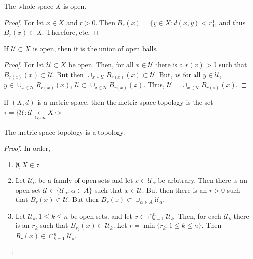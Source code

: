 \documentclass[crop=false,class=article,oneside]{standalone}
\begin{document}
        \begin{theorem}
        The whole space $X$ is open.
        \end{theorem}
        \begin{proof}
        For let $x\in X$ and $r>0$. Then $B_{r}(x) = \{y\in X:d(x,y)<r\}$, and thus $B_{r}(x)\subset X$. Therefore, etc.
        \end{proof}
        \begin{theorem}
        If $\mathcal{U}\subset X$ is open, then it is the union of open balls.
        \end{theorem}
        \begin{proof}
        For let $\mathcal{U} \subset X$ be open. Then, for all $x\in \mathcal{U}$ there is a $r(x)>0$ such that $B_{r(x)}(x) \subset \mathcal{U}$. But then $\cup_{x\in \mathcal{U}}B_{r(x)}(x)\subset \mathcal{U}$. But, as for all $y\in \mathcal{U}$, $y\in \cup_{x\in \mathcal{U}}B_{r(x)}(x)$, $\mathcal{U} \subset \cup_{x\in \mathcal{U}}B_{r(x)}(x)$. Thus, $\mathcal{U}= \cup_{x\in \mathcal{U}}B_{r(x)}(x)$.
        \end{proof}
        \begin{definition}
        If $(X,d)$ is a metric space, then the metric space topology is the set $\tau = \{\mathcal{U}:\mathcal{U}\underset{Open}\subset X\}$>
        \end{definition}
        \begin{theorem}
        The metric space topology is a topology.
        \end{theorem}
        \begin{proof}
        In order,
        \begin{enumerate}
        \item $\emptyset, X \in \tau$
        \item Let $\mathcal{U}_{\alpha}$ be a family of open sets and let $x\in \mathcal{U}_{\alpha}$ be arbitrary. Then there is an open set $\mathcal{U} \in \{\mathcal{U}_{\alpha}:\alpha\in A\}$ such that $x\in \mathcal{U}$. But then there is an $r>0$ such that $B_{r}(x)\subset\mathcal{U}$. But then $B_{r}(x) \subset \cup_{\alpha \in A}\mathcal{U}_{\alpha}$.
        \item Let $\mathcal{U}_{k}, 1\leq k \leq n$ be open sets, and let $x\in \cap_{k=1}^{n} \mathcal{U}_k$. Then, for each $\mathcal{U}_k$ there is an $r_{k}$ such that $B_{r_k}(x)\subset \mathcal{U}_{k}$. Let $r = \min\{r_k:1\leq k \leq n\}$. Then $B_{r}(x) \in \cap_{k=1}^{n}\mathcal{U}_k$.
        \end{enumerate}
        \end{proof}
\end{document}
